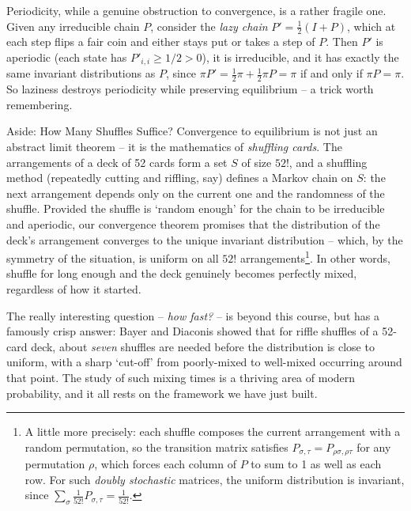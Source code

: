 \documentclass[a4paper]{scrartcl}
\begin{document}
\begin{remark}
	Periodicity, while a genuine obstruction to convergence, is a rather fragile one. Given any irreducible chain $P$, consider the \emph{lazy chain} $P' = \frac{1}{2}(I + P)$, which at each step flips a fair coin and either stays put or takes a step of $P$. Then $P'$ is aperiodic (each state has $P'_{i,i} \geq 1/2 > 0$), it is irreducible, and it has exactly the same invariant distributions as $P$, since $\pi P' = \frac{1}{2}\pi + \frac{1}{2}\pi P = \pi$ if and only if $\pi P = \pi$. So laziness destroys periodicity while preserving equilibrium -- a trick worth remembering.
\end{remark}

\begin{aside}{Aside: How Many Shuffles Suffice?}
	Convergence to equilibrium is not just an abstract limit theorem -- it is the mathematics of \emph{shuffling cards}. The arrangements of a deck of 52 cards form a set $S$ of size $52!$, and a shuffling method (repeatedly cutting and riffling, say) defines a Markov chain on $S$: the next arrangement depends only on the current one and the randomness of the shuffle. Provided the shuffle is `random enough' for the chain to be irreducible and aperiodic, our convergence theorem promises that the distribution of the deck's arrangement converges to the unique invariant distribution -- which, by the symmetry of the situation, is uniform on all $52!$ arrangements\footnote{A little more precisely: each shuffle composes the current arrangement with a random permutation, so the transition matrix satisfies $P_{\sigma, \tau} = P_{\rho\sigma, \rho\tau}$ for any permutation $\rho$, which forces each column of $P$ to sum to 1 as well as each row. For such \emph{doubly stochastic} matrices, the uniform distribution is invariant, since $\sum_{\sigma} \frac{1}{52!} P_{\sigma, \tau} = \frac{1}{52!}$.}. In other words, shuffle for long enough and the deck genuinely becomes perfectly mixed, regardless of how it started.

	The really interesting question -- \emph{how fast?} -- is beyond this course, but has a famously crisp answer: Bayer and Diaconis showed that for riffle shuffles of a 52-card deck, about \emph{seven} shuffles are needed before the distribution is close to uniform, with a sharp `cut-off' from poorly-mixed to well-mixed occurring around that point. The study of such mixing times is a thriving area of modern probability, and it all rests on the framework we have just built.

\end{aside}
\end{document}
